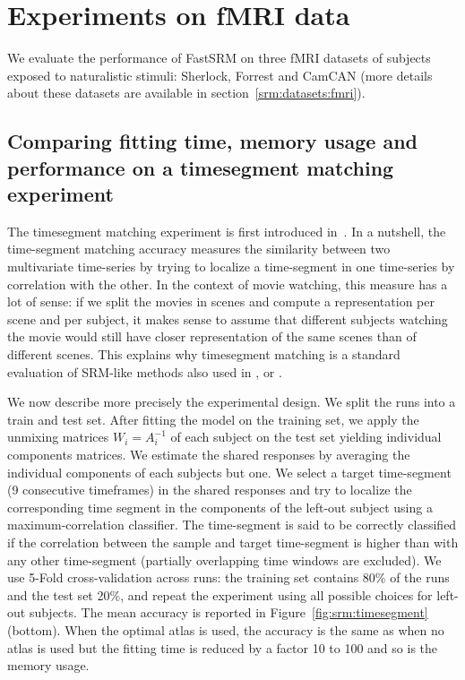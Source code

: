 \section{Experiments on fMRI data}
We evaluate the performance of FastSRM on three fMRI datasets of subjects
exposed to naturalistic stimuli: Sherlock, Forrest and CamCAN (more details
about these datasets are available in section~\ref{srm:datasets:fmri}).
\subsection{Comparing fitting time, memory usage and performance on a
  timesegment matching experiment}
\label{sec:timesegment_expe}
\label{timesegment_expe}
The timesegment matching experiment is first introduced
in~\cite{chen2015reduced}.
In a nutshell, the time-segment matching accuracy measures the similarity between two multivariate time-series by trying to localize a time-segment in one time-series by correlation with the other.
In the context of movie watching, this measure has a lot of sense: if we split
the movies in scenes and compute a representation per scene and per subject, it makes
sense to assume that different subjects watching the movie would still have closer representation of the same scenes than of different scenes.
This explains why timesegment matching is a standard evaluation of SRM-like methods also used in  \cite{guntupalli2018computational}, \cite{Nastase741975} or
\cite{zhang2016searchlight}.

We now describe more precisely the experimental design.
We split the runs into a train and test set. After fitting the model on the
training set, we apply the unmixing matrices $W_i=A_i^{-1}$ of each subject on the test set yielding individual components matrices. We estimate the shared responses by averaging the individual components of each subjects but one.  We select a target time-segment (9 consecutive timeframes) in the shared responses and try to localize the corresponding time segment in the components of the left-out subject using a maximum-correlation classifier.
The time-segment is said to be
correctly classified if the correlation between the sample and target
time-segment is higher than with any other time-segment (partially overlapping time windows are excluded).
% 
We use 5-Fold cross-validation across runs: the training set contains 80\% of the runs and the test set 20\%, and repeat the experiment using all possible choices for left-out subjects. 
% 
The mean accuracy is reported in Figure~\ref{fig:srm:timesegment} (bottom).  When the
optimal atlas is used, the accuracy is the same as when no atlas is used but
the fitting time is reduced by a factor 10 to 100 and so is the memory usage.
% 

